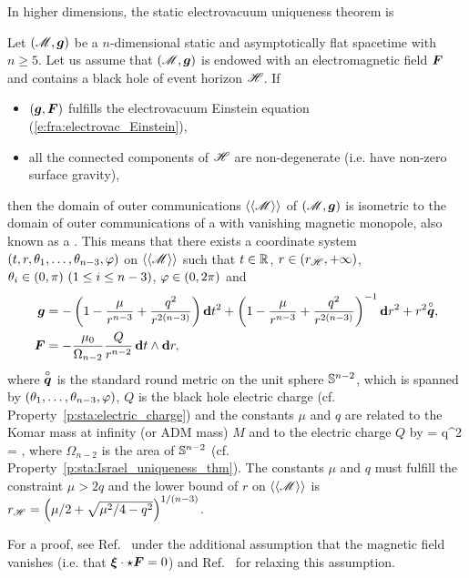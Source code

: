 In higher dimensions, the static electrovacuum uniqueness theorem is

\begin{prop}
\label{p:sta:Israel_uniq_electrovac_n5}
Let $(\mathscr{M},\bm{g})$ be a $n$-dimensional static and asymptotically flat spacetime
with $n\geq 5$. Let us assume that $(\mathscr{M},\bm{g})$ is
endowed with an electromagnetic field $\bm{F}$ and
contains a black hole of event horizon $\mathscr{H}$. If
\begin{itemize}
\item $(\bm{g},\bm{F})$ fulfills the electrovacuum Einstein equation (\ref{e:fra:electrovac_Einstein}),
\item all the connected components of $\mathscr{H}$ are non-degenerate
(i.e. have non-zero surface gravity),
\end{itemize}
then the domain of outer communications $\langle\langle \mathscr{M}\rangle\rangle$ of $(\mathscr{M},\bm{g})$ is isometric
to the domain of outer communications of a
 with vanishing magnetic monopole, also known as a
.
This means that there exists a coordinate system
$(t,r,\theta_1,\ldots,\theta_{n-3},\varphi)$ on $\langle\langle \mathscr{M}\rangle\rangle$ such that
$t\in\mathbb{R}$, $r\in (r_{\mathscr{H}},+\infty)$, $\theta_i \in (0,\pi)\ (1\leq i \leq n-3)$,
$\varphi\in (0, 2\pi)$ and
\begin{subequations}
\label{e:sta:ReiNorTang}
\begin{align}
    \bm{g} & = - \left( 1 - \frac{\mu}{r^{n-3}} + \frac{q^2}{r^{2(n-3)}} \right) \mathbf{d} t^2
    +  \left( 1 - \frac{\mu}{r^{n-3}} + \frac{q^2}{r^{2(n-3)}}  \right) ^{-1} \mathbf{d} r^2
    + r^2 \overset{\circ}{\bm{q}}, \\
    \bm{F} & = - \frac{\mu_0}{\Omega_{n-2}} \frac{Q}{r^{n-2}} \,  \mathbf{d} t \wedge \mathbf{d} r ,
\end{align}
\end{subequations}
where $\overset{\circ}{\bm{q}}$ is the standard round metric on
the unit sphere $\mathbb{S}^{n-2}$, which is
spanned by $(\theta_1,\ldots,\theta_{n-3},\varphi)$,
$Q$ is the black hole electric charge (cf. Property~\ref{p:sta:electric_charge}) and
the constants $\mu$ and $q$ are related to the Komar mass at infinity (or ADM mass)
$M$ and to the electric charge $Q$ by
\be
    \mu = 
    \qand
    q^2 =  ,
\ee
where $\Omega_{n-2}$ is the area of $\mathbb{S}^{n-2}$ (cf. Property~\ref{p:sta:Israel_uniqueness_thm}).
The constants $\mu$ and $q$ must fulfill the constraint $\mu > 2 q$ and the lower bound
of $r$ on $\langle\langle \mathscr{M}\rangle\rangle$ is
$r_{\mathscr{H}} = \left( \mu/2 + \sqrt{\mu^2/4 - q^2}\right) ^{1/(n-3)}$.
\end{prop}
For a proof, see Ref.~\cite{GibboIS02a} under the additional assumption
that the magnetic field vanishes (i.e. that $\bm{\xi}\cdot\star\bm{F}=0$) and Ref.~\cite{KunduL18} for relaxing this assumption.

